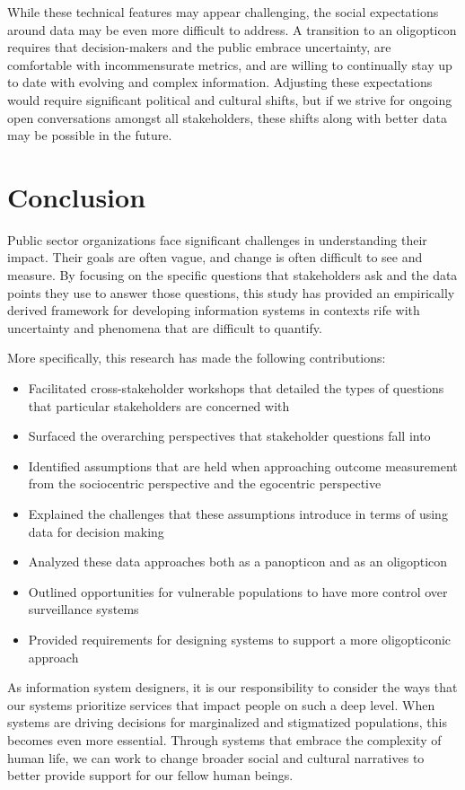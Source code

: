 While these technical features may appear challenging, the social expectations around data may be even more difficult to address. A transition to an oligopticon requires that decision-makers and the public embrace uncertainty, are comfortable with incommensurate metrics, and are willing to continually stay up to date with evolving and complex information. Adjusting these expectations would require significant political and cultural shifts, but if we strive for ongoing open conversations amongst all stakeholders, these shifts along with better data may be possible in the future.

\section{Conclusion}
Public sector organizations face significant challenges in understanding their impact. Their goals are often vague, and change is often difficult to see and measure. By focusing on the specific questions that stakeholders ask and the data points they use to answer those questions, this study has provided an empirically derived framework for developing information systems in contexts rife with uncertainty and phenomena that are difficult to quantify.

More specifically, this research has made the following contributions:

\begin{itemize}
\item Facilitated cross-stakeholder workshops that detailed the types of questions that particular stakeholders are concerned with
\item Surfaced the overarching perspectives that stakeholder questions fall into
\item Identified assumptions that are held when approaching outcome measurement from the sociocentric perspective and the egocentric perspective
\item Explained the challenges that these assumptions introduce in terms of using data for decision making
\item Analyzed these data approaches both as a panopticon and as an oligopticon
\item Outlined opportunities for vulnerable populations to have more control over surveillance systems
\item Provided requirements for designing systems to support a more oligopticonic approach
\end{itemize}

As information system designers, it is our responsibility to consider the ways that our systems prioritize services that impact people on such a deep level. When systems are driving decisions for marginalized and stigmatized populations, this becomes even more essential. Through systems that embrace the complexity of human life, we can work to change broader social and cultural narratives to better provide support for our fellow human beings.